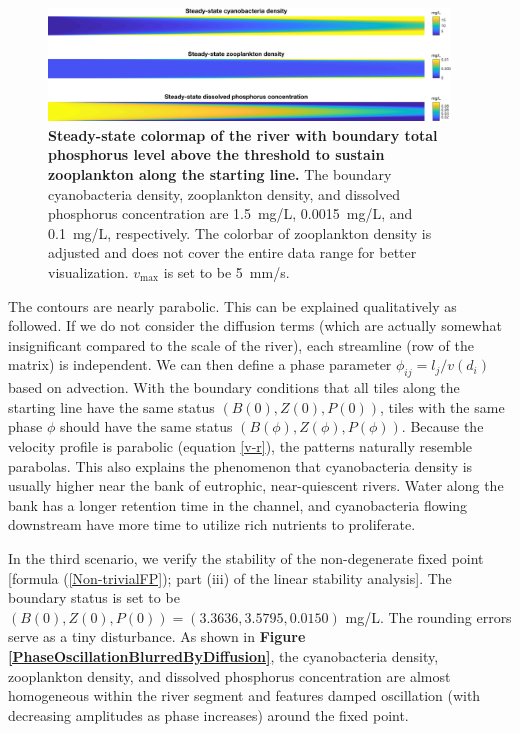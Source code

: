 \documentclass{article}
\begin{document}
\begin{figure}[H]
    \centering
    \includegraphics[width=0.95\textwidth]{ZooplanktonIncrease.pdf}
    \caption{\textbf{Steady-state colormap of the river with boundary total phosphorus level above the threshold to sustain zooplankton along the starting line.} The boundary cyanobacteria density, zooplankton density, and dissolved phosphorus concentration are \SI{1.5}{mg/L}, \SI{0.0015}{mg/L}, and \SI{0.1}{mg/L}, respectively. The colorbar of zooplankton density is adjusted and does not cover the entire data range for better visualization. $v_{\max}$ is set to be \SI{5}{mm/s}.}
    \label{ZIncrease}
\end{figure}

The contours are nearly parabolic. This can be explained qualitatively as followed. If we do not consider the diffusion terms (which are actually somewhat insignificant compared to the scale of the river), each streamline (row of the matrix) is independent. We can then define a phase parameter $\phi_{ij} = l_j / v(d_i)$ based on advection. With the boundary conditions that all tiles along the starting line have the same status $(B(0), Z(0), P(0))$, tiles with the same phase $\phi$ should have the same status $(B(\phi), Z(\phi), P(\phi))$. Because the velocity profile is parabolic (equation \ref{v-r}), the patterns naturally resemble parabolas. This also explains the phenomenon that cyanobacteria density is usually higher near the bank of eutrophic, near-quiescent rivers. Water along the bank has a longer retention time in the channel, and cyanobacteria flowing downstream have more time to utilize rich nutrients to proliferate.

In the third scenario, we verify the stability of the non-degenerate fixed point [formula (\ref{Non-trivialFP}); part (iii) of the linear stability analysis]. The boundary status is set to be $(B(0), Z(0), P(0)) = (3.3636, 3.5795, 0.0150)$ mg/L. The rounding errors serve as a tiny disturbance. As shown in \textbf{Figure \ref{PhaseOscillationBlurredByDiffusion}}, the cyanobacteria density, zooplankton density, and dissolved phosphorus concentration are almost homogeneous within the river segment and features damped oscillation (with decreasing amplitudes as phase increases) around the fixed point. 
\end{document}
